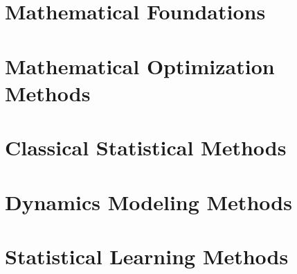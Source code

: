 \documentclass[oneside,hidelinks,12pt,letterpaper]{scrbook} %
\theoremstyle{remark}
\theoremstyle{coloredRemark}
\theoremstyle{coloredNote}
\begin{document}
\newpage

\hypersetup{colorlinks=false}

\newpage

\listofalgorithms
\listoffigures
\listoftables

\dominitoc
\tableofcontents 



\hypersetup{
	colorlinks=true,
	linkcolor=blue}

\mainmatter

\printnomenclature





\part{Mathematical Foundations}



\startcontents[chapters]

\part{Mathematical Optimization Methods}





\startcontents[chapters]
\part{Classical Statistical Methods}





\startcontents[chapters]
\part{Dynamics Modeling Methods}











\startcontents[chapters]
\part{Statistical Learning Methods}




\end{document}
